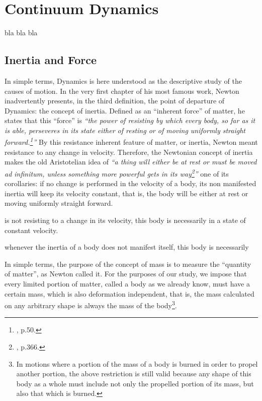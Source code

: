 \chapter{Continuum Dynamics}

bla bla bla        


\section{Inertia and Force} 

In simple terms, Dynamics is here understood as the descriptive study of the causes of motion. In the very first chapter of his most famous work, Newton inadvertently presents, in the third definition, the point of departure of Dynamics: the concept of inertia. Defined as an ``inherent force'' of matter, he states that this ``force'' is \emph{``the power of resisting by which every body, so far as it is able, perseveres in its state either of resting or of moving uniformly straight forward.\footnote{\cite{newton_1999_1}, p.50.}''} By this resistance inherent feature of matter, or inertia, Newton meant resistance to any change in velocity. Therefore, the Newtonian concept of inertia makes the old Aristotelian idea of \emph{``a thing will either be at rest or must be moved \emph{ad infinitum}, unless something more powerful gets in its way\footnote{\cite{aristotle_1984_1}, p.366.}''} one of its corollaries: if no change is performed in the velocity of a body, its non manifested inertia will keep its velocity constant, that is, the body will be either at rest or moving uniformly straight forward.



 is not resisting to a change in its velocity, this body is necessarily in a state of constant velocity. 

whenever the inertia of a body does not manifest itself, this body is necessarily       


In simple terms, the purpose of the concept of mass is to measure the ``quantity of matter'', as Newton called it. For the purposes of our study, we impose that every limited portion of matter, called a body as we already know, must have a certain mass, which is also deformation independent, that is, the mass calculated on any arbitrary shape is always the mass of the body\footnote{In motions where a portion of the mass of a body is burned in order to propel another portion, the above restriction is still valid because any shape of this body as a whole must include not only the propelled portion of its mass, but also that which is burned.}.

